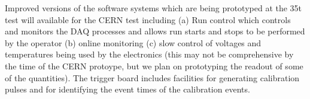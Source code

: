 Improved versions of the software systems which are being prototyped at the 
35t test will available for the CERN test including (a) Run control which 
controls and monitors the DAQ processes and allows run starts and stops to
be performed by the operator (b) online monitoring (c) slow control of 
voltages and temperatures being used by the electronics (this may not be 
comprehensive by the time of the CERN protoype, but we plan on prototyping 
the readout of some of the quantities).  The trigger board includes facilities 
for generating calibration pulses and for identifying the event times of 
the calibration events.

